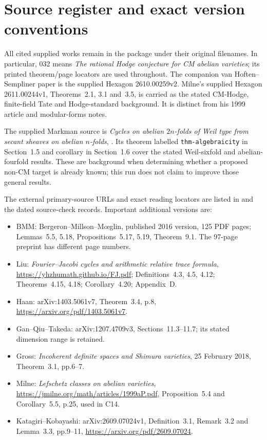 \section{Source register and exact version conventions}

All cited supplied works remain in the package under their original
filenames. In particular, 032 means
\emph{The rational Hodge conjecture for CM abelian varieties}; its
printed theorem/page locators are used throughout. The companion
van Hoften--Sempliner paper is the supplied Hexagon 2610.00259v2.
Milne's supplied Hexagon 2611.00244v1, Theorems~2.1, 3.1 and~3.5,
is carried as the stated CM-Hodge, finite-field Tate and Hodge-standard
background. It is distinct from his 1999 article and modular-forms notes.

The supplied Markman source is \emph{Cycles on abelian $2n$-folds of
Weil type from secant sheaves on abelian $n$-folds},
.
Its theorem labelled \texttt{thm-algebraicity} in Section~1.5 and
corollary in Section~1.6 cover the stated Weil-sixfold and
abelian-fourfold results. These are background when determining
whether a proposed non-CM target is already known; this run does
not claim to improve those general results.

The external primary-source URLs and exact reading locators are
listed in  and the
dated source-check records. Important additional versions are:
\begin{itemize}[leftmargin=*]
\item BMM: Bergeron--Millson--M\oe glin, published 2016 version,
125 PDF pages; Lemmas~5.5, 5.18, Propositions~5.17, 5.19,
Theorem~9.1. The 97-page preprint has different page numbers.
\item Liu: \emph{Fourier--Jacobi cycles and arithmetic relative
trace formula}, \url{https://yhzhumath.github.io/FJ.pdf};
Definitions~4.3, 4.5, 4.12; Theorems~4.15, 4.18;
Corollary~4.20; Appendix~D.
\item Haan: arXiv:1403.5061v7, Theorem~3.4, p.8,
\url{https://arxiv.org/pdf/1403.5061v7}.
\item Gan--Qiu--Takeda: arXiv:1207.4709v3,
Sections~11.3--11.7; its stated dimension range is retained.
\item Gross: \emph{Incoherent definite spaces and Shimura varieties},
25 February 2018, Theorem~3.1, pp.6--7.
\item Milne: \emph{Lefschetz classes on abelian varieties},
\url{https://jmilne.org/math/articles/1999aP.pdf},
Proposition~5.4 and Corollary~5.5, p.25, used in C14.
\item Katagiri--Kobayashi: arXiv:2609.07024v1,
Definition~3.1, Remark~3.2 and Lemma~3.3, pp.9--11,
\url{https://arxiv.org/pdf/2609.07024}.
\end{itemize}

